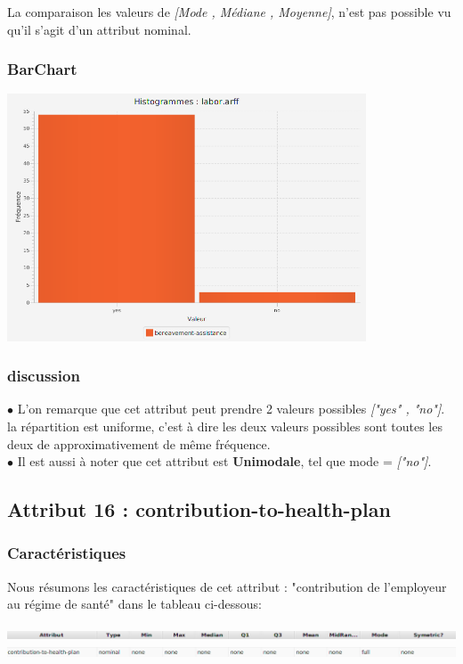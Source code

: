 \documentclass[12pt,a4paper,oneside]{book}
\begin{document}
La comparaison les valeurs de \textit{[Mode , Médiane , Moyenne]}, n'est pas possible vu qu'il s'agit d'un attribut nominal.

\subsubsection{BarChart}

\begin{center}
	\includegraphics[width=0.8\textwidth]{screens/barchart/bereavement-assistance-barchart.png}%
	\label{labelname}%
\end{center}

\subsubsection{discussion}
$\bullet $ L'on remarque que cet attribut peut prendre 2 valeurs possibles \textit{["yes" , "no"]}.  la répartition est uniforme, c'est à dire les deux valeurs possibles sont toutes les deux de approximativement de même fréquence.\\
$\bullet $ Il est aussi à noter que cet attribut est \textbf{Unimodale}, tel que mode = \textit{["no"]}.

\newpage

\subsection{Attribut 16 : contribution-to-health-plan }
\subsubsection{Caractéristiques}
Nous résumons les caractéristiques de cet attribut : "contribution de l'employeur au régime de santé" dans le tableau ci-dessous:
\begin{center}
	\includegraphics[width=1\textwidth]{screens/att.png}\\ \includegraphics[width=1\textwidth]{screens/att-16.png}%
	\label{labelname}%
\end{center}
\end{document}

